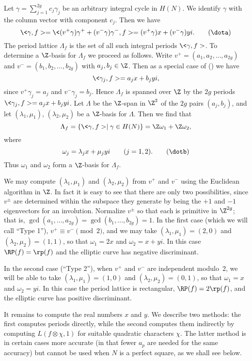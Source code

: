 Let $\gamma=\sum_{j=1}^{2g}c_j\gamma_j$ be an arbitrary integral
cycle in $H(N)$.   We identify $\gamma$ with the column vector with
component $c_j$.  Then we have \neweq{\dota}
$$
 \<\gamma,f> = \<(v^{+}\gamma)\gamma^{+}+(v^{-}\gamma)\gamma^{-},f>
             =   (v^{+}\gamma)x + (v^{-}\gamma)yi.
                                                         \tag \dota
$$
The period lattice $\Lambda_f$ is the set of all such integral periods
$\<\gamma,f>$.
To determine a $\Z$-basis for $\Lambda_f$ we proceed as follows.   Write
$v^{+} = (a_1,a_2,\ldots,a_{2g})$ and $v^{-} = (b_1,b_2,\ldots,b_{2g})$
with $a_j, b_j \in\Z$.   Then as a special case of (\dota) we have
$$
  \<\gamma_j,f>=a_jx+b_jyi,
$$
since $v^{+}\gamma_j =a_j$ and $v^{-}\gamma_j =b_j$.
Hence $\Lambda_f$ is spanned over $\Z$ by the $2g$ periods 
$\<\gamma_j,f>=a_jx+b_jyi$.
Let $\Lambda$ be the $\Z$-span in $\Z^2$ of the $2g$
pairs $(a_j,b_j)$, and let $(\lambda_1,\mu_1)$, $(\lambda_2,\mu_2)$ be a
$\Z$-basis for $\Lambda$.   Then we find that
$$
  \Lambda_f = \{ \<\gamma,f> \mid \gamma\in H(N) \}
                 = \Z\omega_1+\Z\omega_2,
$$
where \neweq{\dotb}
$$
    \omega_j=\lambda_jx+\mu_jyi  \qquad(j=1,2).  \tag \dotb
$$
Thus $\omega_1$ and $\omega_2$ form a $\Z$-basis for $\Lambda_f$.

We may compute $(\lambda_1,\mu_1)$ and $(\lambda_2,\mu_2)$ from
$v^{+}$ and $v^{-}$ using the Euclidean algorithm in $\Z$.  In fact it
is easy to see that there are only two possibilities, since $v^{\pm}$
are determined within the subspace they generate by being the $+1$ and
$-1$ eigenvectors for an involution.  Normalize $v^{\pm}$ so that each
is primitive in $\Z^{2g}$; that is,
$\gcd(a_1,\ldots,a_{2g})=\gcd(b_1,\ldots,b_{2g})=1$. In the first case
(which we will call ``Type 1''), $v^+ \equiv v^-\pmod2$, and we may
take $(\lambda_1,\mu_1)=(2,0)$ and $(\lambda_2,\mu_2)=(1,1)$, so that
$\omega_1=2x$ and $\omega_2=x+yi$.  In this case $\RP(f)=\rp(f)$ and
the elliptic curve has negative discriminant.

In the second case (``Type 2''), when $v^+$ and $v^-$ are independent
modulo~2, we will be able to take $(\lambda_1,\mu_1)=(1,0)$ and
$(\lambda_2,\mu_2)=(0,1)$, so that $\omega_1=x$ and $\omega_2=yi$.  In
this case the period lattice is rectangular, $\RP(f)=2\rp(f)$, and the
elliptic curve has positive discriminant.

It remains to compute the real numbers $x$ and $y$.  We describe two
methods: the first computes periods directly, while the second
computes them indirectly by computing $L(f\otimes\chi,1)$ for suitable
quadratic characters $\chi$. The latter method is in certain cases
more accurate (in that fewer $a_p$ are needed for the same accuracy)
but cannot be used when $N$ is a perfect square, as we shall see
below.

